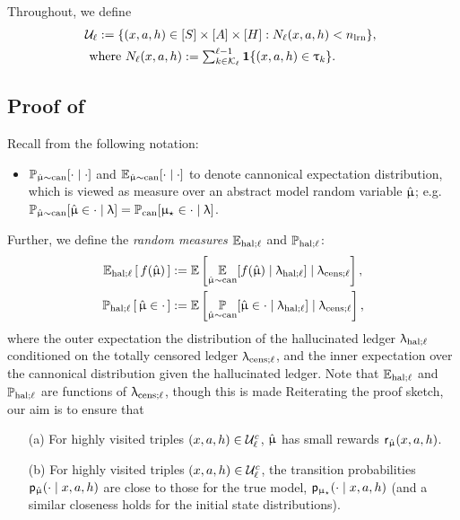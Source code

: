 
Throughout, we define
\begin{align}
&\mathcal{U}_{\ell} := \{(x,a,h) \in [S] \times [A] \times [H] : N_{\ell}(x,a,h) < n_{\mathrm{lrn}}\}, ~ \label{eq:calU_def}\\
&\text{ where } N_{\ell}(x,a,h) := \textstyle\sum_{k \in \mathcal{K}_{\ell}}^{\ell-1} \mathbf{1}\{(x,a,h) \in {\uptau}_{k}\} \nonumber.
\end{align}

\subsection{Proof of  \label{sec:lemma:gap_bound_prob}}

Recall from  the following notation:
\begin{itemize}
\item $\Prmucan[\cdot \mid \cdot]$ and $\Expmucan[\cdot \mid \cdot]$ to denote cannonical expectation distribution, which is viewed as measure over an abstract model random variable $\hat{\upmu}$; e.g. $\Prmucan[\modvarhat \in \cdot \mid \ledger] = \Prcan[\modst \in \cdot  \mid \ledger]$.
\end{itemize}
Further, we define the \emph{random measures} $\mathbb{E}_{\mathrm{hal};\ell}$ and $\operatorname{\mathbb{P}}_{\mathrm{hal};\ell}$:
\begin{align}
\Exphall\sbr{f(\modvarhat)}
    &:= \Expop\left[\Expmucan[f(\modvarhat) \mid \ledhall] \mid \ledcensl\right],\nonumber\\
\Prhall\sbr{\modvarhat \in \cdot}
    &:= \Expop\left[\Prmucan[\modvarhat \in \cdot \mid \ledhall] \mid \ledcensl\right]   \label{eq:hallucination_expectations},
\end{align}
where the outer expectation  the distribution of the hallucinated ledger $\uplambda_{\mathrm{hal};\ell}$ conditioned on the totally censored ledger $\uplambda_{\mathrm{cens};\ell}$, and the inner expectation over the cannonical distribution given the hallucinated ledger. Note that $\mathbb{E}_{\mathrm{hal};\ell}$ and $\operatorname{\mathbb{P}}_{\mathrm{hal};\ell}$ are functions of $\uplambda_{\mathrm{cens};\ell}$, though this is made
Reiterating the proof sketch, our aim is to ensure that
\begin{itemize}
\item[(a)] For highly visited triples $(x,a,h) \in \mathcal{U}_{\ell}^c$, $\hat{\upmu}$ has small rewards $\mathsf{r}_{\hat{\upmu}}(x,a,h)$.
\item[(b)] For highly visited triples $(x,a,h) \in \mathcal{U}_{\ell}^c$, the transition probabilities $\mathsf{p}_{\hat{\upmu}}(\cdot \mid x,a,h)$ are close to those for the true model, $\mathsf{p}_{\upmu_{\star}}(\cdot \mid x,a,h)$ (and a similar closeness holds for the initial state distributions).
\end{itemize}



